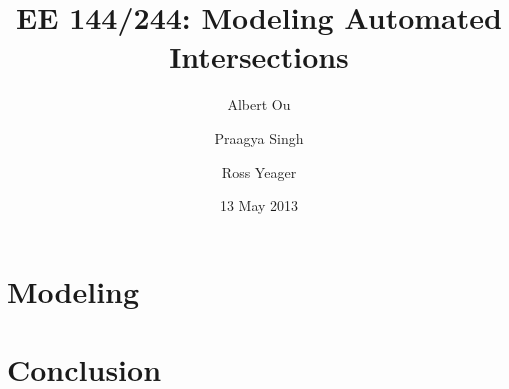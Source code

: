 \documentclass{beamer}
\title[EE 144/244: Automated Intersections]{EE 144/244: Modeling Automated Intersections}
\author[Ou, Singh, Yeager]{
	Albert Ou \and Praagya Singh \and Ross Yeager}
\institute[UC Berkeley]{University of California, Berkeley}
\date[2013{\textndash}05{\textndash}13]{13 May 2013}
\begin{document}
\frame{\titlepage}



\section{Modeling}




\section{Conclusion}

\end{document}
